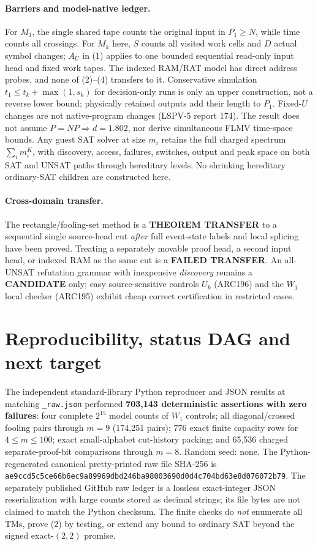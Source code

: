 \documentclass[11pt]{article}
\begin{document}
\paragraph{Barriers and model-native ledger.}
For $M_1$, the single shared tape counts the original
input in $P_1\ge N$, while time counts all crossings.
For $M_k$ here, $S$ counts all visited work cells and
$D$ actual symbol changes; $A_U$ in (1) applies to
one bounded sequential read-only input head and fixed
work tapes. The indexed RAM/RAT model has direct
address probes, and none of (2)--(4) transfers to it.
Conservative simulation
$t_1\le t_k+\max(1,s_k)$ for decision-only runs
is only an upper construction, not a reverse lower
bound; physically retained outputs add their length
to $P_1$. Fixed-$U$ changes are not native-program
changes (LSPV-5 report 174). The result does not
assume $P=NP\Rightarrow d=1.802$, nor derive
simultaneous FLMV time-space bounds.
Any guest SAT solver at size $m_i$ retains the full
charged spectrum $\sum_i m_i^K$, with discovery,
access, failures, switches, output and peak space
on both SAT and UNSAT paths through hereditary levels.
No shrinking hereditary ordinary-SAT children are
constructed here.

\paragraph{Cross-domain transfer.}
The rectangle/fooling-set method is a
\textbf{THEOREM TRANSFER} to a sequential single
source-head cut \emph{after} full event-state labels
and local splicing have been proved.
Treating a separately movable proof head, a second
input head, or indexed RAM as the same cut is a
\textbf{FAILED TRANSFER}. An all-UNSAT refutation
grammar with inexpensive \emph{discovery} remains a
\textbf{CANDIDATE} only; easy source-sensitive controls
$U_k$ (ARC196) and the $W_1$ local checker (ARC195)
exhibit cheap correct certification in restricted cases.

\section{Reproducibility, status DAG and next target}
The independent standard-library Python reproducer
and JSON results at matching \texttt{\_raw.json} performed
\textbf{703,143 deterministic assertions with zero failures}:
four complete $2^{15}$ model counts of $W_1$ controls;
all diagonal/crossed fooling pairs through $m=9$
(174,251 pairs); 776 exact finite capacity rows
for $4\le m\le100$; exact small-alphabet cut-history
packing; and 65,536 charged separate-proof-bit
comparisons through $m=8$. Random seed: none.
The Python-regenerated canonical pretty-printed raw file SHA-256 is
\texttt{ae9ccd5c5ce66b6ec9a89969dbd246ba98003690d0d4c704bd63e8d076072b79}.
The separately published GitHub raw ledger is a lossless exact-integer
JSON reserialization with large counts stored as decimal strings;
its file bytes are not claimed to match the Python checksum.
The finite checks do \emph{not} enumerate all TMs,
prove (2) by testing, or extend any bound to ordinary
SAT beyond the signed exact-$(2,2)$ promise.
\end{document}
